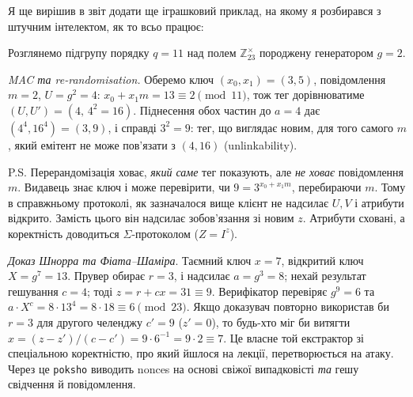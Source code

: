 Я ще вирішив в звіт додати ще іграшковий приклад, на якому я розбирався з штучним інтелектом, як то всьо працює:
\begin{examplebox}
  Розглянемо підгрупу порядку $q=11$ над полем $\mathbb{Z}_{23}^{\times}$ породжену генератором $g=2$.

  \emph{MAC та re-randomisation.} Оберемо ключ $(x_0,x_1)=(3,5)$, повідомлення $m=2$, $U=g^2=4$: $x_0+x_1m = 13 \equiv 2 \pmod{11}$, 
  тож тег дорівнюватиме $(U,U')=(4,\,4^2=16)$. Піднесення обох частин до $a=4$ дає $(4^4,16^4)=(3,9)$, і справді 
  $3^2=9$: тег, що виглядає новим, для того самого $m$, який емітент не може пов'язати з $(4, 16)$ (unlinkability).

  P.S. Перерандомізація ховає, \emph{який саме} тег показують, але \emph{не ховає} повідомлення $m$. Видавець знає 
  ключ і може перевірити, чи $9 = 3^{x_0 + x_1 m}$, перебираючи $m$. Тому в справжньому протоколі, як зазначалося 
  вище клієнт не надсилає $U, V$ і атрибути відкрито. Замість цього він надсилає зобов'язання зі новим $z$. 
  Атрибути сховані, а коректність доводиться $\Sigma$-протоколом ($Z = I^z$).

  \emph{Доказ Шнорра та Фіата–Шаміра}. Таємний ключ $x = 7$, відкритий ключ $X = g^7 = 13$. Прувер обирає $r = 3$, 
  і надсилає $a = g^3 = 8$; нехай результат гешування $c = 4$; тоді $z = r + cx = 31 \equiv 9$. Верифікатор перевіряє 
  $g^9=6$ та $a \cdot X^c = 8 \cdot 13^4 = 8 \cdot 18 \equiv 6 \pmod{23}$. Якщо доказувач повторно використав би 
  $r=3$ для другого челенджу $c'=9$ ($z'=0$), то будь-хто міг би витягти $x=(z-z')/(c-c')=9\cdot 6^{-1}=9\cdot 2\equiv 7$.
  Це власне той екстрактор зі спеціальною коректністю, про який йшлося на лекції, перетворюється на атаку. Через 
  це \texttt{poksho} виводить nonces на основі свіжої випадковісті \emph{та} гешу свідчення й повідомлення.
\end{examplebox}

